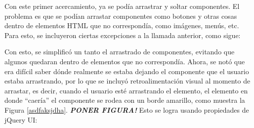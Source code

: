 \documentclass[12pt,titlepage,]{article}
\newenvironment{Shaded}{}{}
\newcommand{\KeywordTok}[1]{\textcolor[rgb]{0.00,0.44,0.13}{\textbf{{#1}}}}
\newcommand{\StringTok}[1]{\textcolor[rgb]{0.25,0.44,0.63}{{#1}}}
\newcommand{\CommentTok}[1]{\textcolor[rgb]{0.38,0.63,0.69}{\textit{{#1}}}}
\newcommand{\NormalTok}[1]{{#1}}
\begin{document}
\begin{Shaded}
\end{Shaded}

Con este primer acercamiento, ya se podía arrastrar y soltar
componentes. El problema es que se podían arrastar componentes como
botones y otras cosas dentro de elementos HTML que no correspondía, como
imágenes, menús, etc. Para esto, se incluyeron ciertas excepciones a la
llamada anterior, como sigue:

\begin{Shaded}
\end{Shaded}

Con esto, se simplificó un tanto el arrastrado de componentes, evitando
que algunos quedaran dentro de elementos que no correspondía. Ahora, se
notó que era difícil saber dónde realmente se estaba dejando el
componente que el usuario estaba arrastrando, por lo que se incluyó
retroalimentación visual al momento de arrastar, es decir, cuando el
usuario esté arrastrando el elemento, el elemento en donde ``caería'' el
componente se rodea con un borde amarillo, como muestra la Figura
\ref{asdfaksjdha}. \textbf{\emph{PONER FIGURA!}} Esto se logra usando
propiedades de jQuery UI:

\begin{Shaded}
\end{Shaded}
\end{document}
